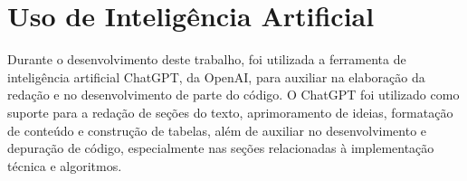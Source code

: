 \documentclass{eic-bcc-tcc}
\begin{document}
\begin{table}[h!]
\centering
{}
\caption{Cronograma de Planejamento para desenvolvimento do TCC2}
\end{table}

\section{Uso de Inteligência Artificial}

Durante o desenvolvimento deste trabalho, foi utilizada a ferramenta de inteligência artificial ChatGPT, da OpenAI, para auxiliar na elaboração da redação e no desenvolvimento de parte do código. O ChatGPT foi utilizado como suporte para a redação de seções do texto, aprimoramento de ideias, formatação de conteúdo e construção de tabelas, além de auxiliar no desenvolvimento e depuração de código, especialmente nas seções relacionadas à implementação técnica e algoritmos.

\backmatter

\end{document}
